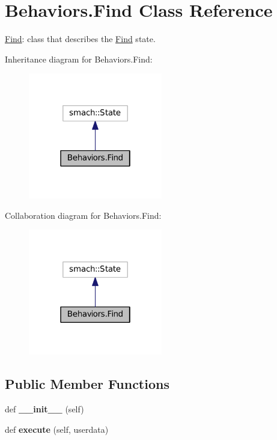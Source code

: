 \hypertarget{classBehaviors_1_1Find}{}\section{Behaviors.\+Find Class Reference}
\label{classBehaviors_1_1Find}


\hyperlink{classBehaviors_1_1Find}{Find}\+: class that describes the \hyperlink{classBehaviors_1_1Find}{Find} state.  




Inheritance diagram for Behaviors.\+Find\+:\nopagebreak
\begin{figure}[H]
\begin{center}
\leavevmode
\includegraphics[width=166pt]{classBehaviors_1_1Find__inherit__graph}
\end{center}
\end{figure}


Collaboration diagram for Behaviors.\+Find\+:\nopagebreak
\begin{figure}[H]
\begin{center}
\leavevmode
\includegraphics[width=166pt]{classBehaviors_1_1Find__coll__graph}
\end{center}
\end{figure}
\subsection*{Public Member Functions}
\begin{DoxyCompactItemize}
\item 
def {\bfseries \+\_\+\+\_\+init\+\_\+\+\_\+} (self)\hypertarget{classBehaviors_1_1Find_a50fe385da0196f85d03c9215531e8468}{}\label{classBehaviors_1_1Find_a50fe385da0196f85d03c9215531e8468}

\item 
def {\bfseries execute} (self, userdata)\hypertarget{classBehaviors_1_1Find_a4910773265944430bb02fc53318fb956}{}\label{classBehaviors_1_1Find_a4910773265944430bb02fc53318fb956}

\end{DoxyCompactItemize}



